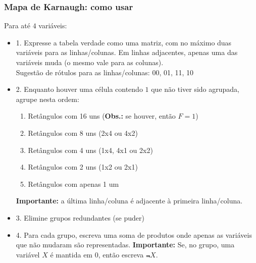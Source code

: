 \documentclass{beamer}
\newcommand{\comment}[1]{{\color{structure.fg!70!white}\footnotesize #1}}
\begin{document}
\begin{frame}
\frametitle{Mapa de Karnaugh: como usar}

\small

Para até $4$ variáveis:

\begin{itemize}
\item 1. Expresse a tabela verdade como uma matriz, com no máximo
duas variáveis para as linhas/colunas. Em linhas adjacentes,
apenas uma das variáveis muda (o mesmo vale para as colunas).\\
\comment{Sugestão de rótulos para as linhas/colunas: 00, 01, 11, 10}
\pause
\item 2. Enquanto houver uma célula contendo $1$ que não tiver sido
agrupada, agrupe nesta ordem:
\begin{enumerate}
\item Retângulos com 16 uns (\textbf{Obs.:} se houver, então $F = 1$)
\pause
\item Retângulos com 8 uns (2x4 ou 4x2)
\pause
\item Retângulos com 4 uns (1x4, 4x1 ou 2x2)
\pause
\item Retângulos com 2 uns (1x2 ou 2x1)
\pause
\item Retângulos com apenas 1 um
\pause
\end{enumerate}
\textbf{Importante: } a última linha/coluna é adjacente à primeira linha/coluna.
\pause
\item 3. Elimine grupos redundantes (se puder)
\pause
\item 4. Para cada grupo, escreva uma soma de produtos onde apenas as
variáveis que não mudaram são representadas. \textbf{Importante: } 
Se, no grupo, uma variável $X$ é mantida em $0$, então escreva $\Not{X}$.
\end{itemize}
\end{frame}
\end{document}
